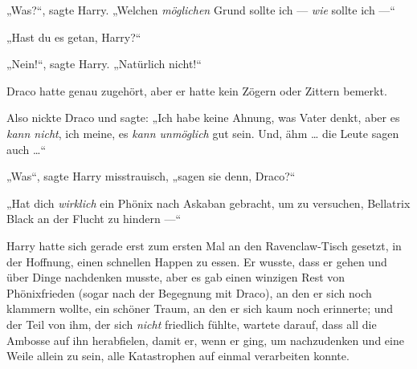 „Was?“, sagte Harry.
„Welchen \emph{möglichen} Grund sollte ich — \emph{wie} sollte ich —“

„Hast du es getan, Harry?“

„Nein!“, sagte Harry.
„Natürlich nicht!“

Draco hatte genau zugehört, aber er hatte kein Zögern oder Zittern bemerkt.

Also nickte Draco und sagte:
„Ich habe keine Ahnung, was Vater denkt, aber es \emph{kann nicht}, ich meine, es \emph{kann unmöglich} gut sein. Und, ähm … die Leute sagen auch …“

„Was“, sagte Harry misstrauisch, „sagen sie denn, Draco?“

„Hat dich \emph{wirklich} ein Phönix nach Askaban gebracht, um zu versuchen, Bellatrix Black an der Flucht zu hindern —“


Harry hatte sich gerade erst zum ersten Mal an den Ravenclaw-Tisch gesetzt, in der Hoffnung, einen schnellen Happen zu essen. Er wusste, dass er gehen und über Dinge nachdenken musste, aber es gab einen winzigen Rest von Phönixfrieden (sogar nach der Begegnung mit Draco), an den er sich noch klammern wollte, ein schöner Traum, an den er sich kaum noch erinnerte; und der Teil von ihm, der sich \emph{nicht} friedlich fühlte, wartete darauf, dass all die Ambosse auf ihn herabfielen, damit er, wenn er ging, um nachzudenken und eine Weile allein zu sein, alle Katastrophen auf einmal verarbeiten konnte.

